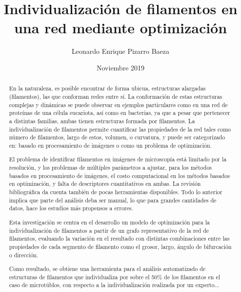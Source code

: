 \documentclass[upright, contnum]{umemoria}
\author{Leonardo Enrique Pizarro Baeza}
\title{Individualizaci\'on de filamentos en una red mediante optimizaci\'on}
\date{Noviembre 2019}
\begin{document}
\frontmatter
\maketitle

\begin{abstract}
En la naturaleza, es posible encontrar de forma ubicua, estructuras alargadas (filamentos), las que conforman redes entre s\'i.  La conformaci\'on de estas estructuras complejas y din\'amicas se puede observar en ejemplos
particulares como en una red de prote\'inas de una c\'elula eucariota, as\'i como en bacterias, ya que a pesar que pertenecer a distintas familias, ambas tienen estructuras formada por filamentos. La individualizaci\'on de filamentos permite cuantificar las propiedades de la red tales como n\'umero de filamentos, largo de estos, volumen, o curvatura, y  puede ser categorizado en: basado en procesamiento de im\'agenes o como un problema de optimizaci\'on.

El problema de identificar filamentos en im\'agenes de microscop\'ia est\'a limitado por la resoluci\'on, y los problemas de m\'ultiples par\'ametros a ajustar, para los m\'etodos basados en procesamiento de im\'agenes, el costo
computacional en los m\'etodos basados en optimizaci\'on, y falta de descriptores cuantitativos en ambas. La revisi\'on bibliogr\'afica da cuenta tambi\'en de pocas herramientas disponibles. Todo lo anterior implica que parte del an\'alisis deba ser manual, lo que para grandes cantidades de datos, hace los estudios más propensos a errores.

Esta investigación se centra en el desarrollo un modelo de optimizaci\'on para la individualizaci\'on de filamentos a partir de un grafo representativo de la red de filamentos, evaluando la variaci\'on en el resultado con distintas combinaciones entre las propiedades de cada segmento de filamento como el grosor, largo, \'angulo de bifurcaci\'on o direcci\'on.


Como resultado, se obtiene una herramienta para el an\'alisis automatizado de estructuras de filamentos que individualiza por sobre el 50\% de los filamentos en el caso de microt\'ublos, con respecto a la individualizaci\'on realizada por un experto...

\end{abstract}
\end{document}
